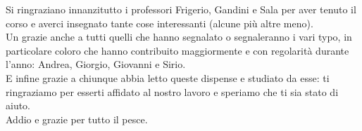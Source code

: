Si ringraziano innanzitutto i professori Frigerio, Gandini e Sala per aver tenuto il corso e averci insegnato tante cose interessanti (alcune più altre meno). \\
Un grazie anche a tutti quelli che hanno segnalato o segnaleranno i vari typo, in particolare coloro che hanno contribuito maggiormente e con regolarità durante l'anno: Andrea, Giorgio, Giovanni e Sirio. \\
E infine grazie a chiunque abbia letto queste dispense e studiato da esse: ti ringraziamo per esserti affidato al nostro lavoro e speriamo che ti sia stato di aiuto. \\
Addio e grazie per tutto il pesce.
